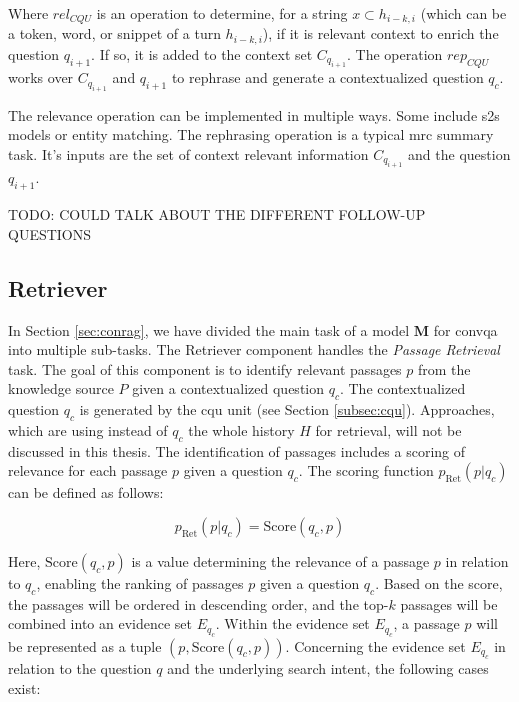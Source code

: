 Where $rel_{CQU}$ is an operation to determine, for a string $x \subset h_{i-k,i}$ (which can be a token, word, or snippet of a turn $h_{i-k,i}$), if it is relevant context to enrich the question $q_{i+1}$. If so, it is added to the context set $C_{q_{i+1}}$. The operation $rep_{CQU}$ works over $C_{q_{i+1}}$ and $q_{i+1}$ to rephrase and generate a contextualized question $q_c$.

The relevance operation can be implemented in multiple ways. Some include \gls{s2s} models or entity matching. The rephrasing operation is a typical \gls{mrc} summary task. It's inputs are the set of context relevant information $C_{q_{i+1}}$ and the question $q_{i+1}$. 

TODO: COULD TALK ABOUT THE DIFFERENT FOLLOW-UP QUESTIONS

\subsection{Retriever}
\label{subsec:retriever}

In Section \ref{sec:conrag}, we have divided the main task of a model $\mathbf{M}$ for \gls{convqa} into multiple sub-tasks. The Retriever component handles the \textit{Passage Retrieval} task. The goal of this component is to identify relevant passages $p$ from the knowledge source $P$ given a contextualized question $q_c$. The contextualized question $q_c$ is generated by the \gls{cqu} unit (see Section \ref{subsec:cqu}). Approaches, which are using instead of $q_c$ the whole history $H$ for retrieval, will not be discussed in this thesis. The identification of passages includes a scoring of relevance for each passage $p$ given a question $q_c$. The scoring function $p_{\text{Ret}}(p|q_c)$ can be defined as follows:

\begin{equation}
    p_{\text{Ret}}(p|q_c) = \text{Score}(q_c,p)
    \label{eq:retriever}
\end{equation}

Here, $\text{Score}(q_c,p)$ is a value determining the relevance of a passage $p$ in relation to $q_c$, enabling the ranking of passages $p$ given a question $q_c$. Based on the score, the passages will be ordered in descending order, and the top-$k$ passages will be combined into an evidence set $E_{q_c}$. Within the evidence set $E_{q_c}$, a passage $p$ will be represented as a tuple $(p, \text{Score}(q_c,p))$. Concerning the evidence set $E_{q_c}$ in relation to the question $q$ and the underlying search intent, the following cases exist:

